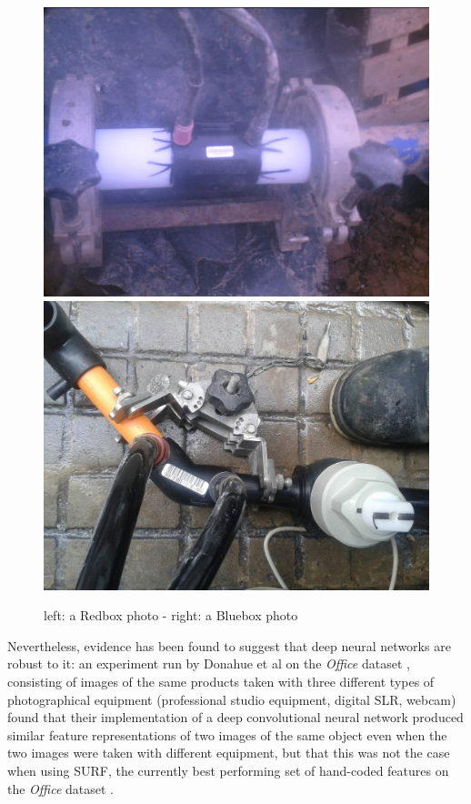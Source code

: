 \documentclass[a4paper,11pt]{article}
\begin{document}
\begin{figure}[h!]
	\centering
	\includegraphics[scale=0.34]{images/perfect3.jpg}
	\includegraphics[scale=0.17]{images/niceBluebox_100974.jpg}
	\caption{left: a Redbox photo - right: a Bluebox photo}
\end{figure}

Nevertheless, evidence has been found to suggest that deep neural networks are robust to it: an experiment run by Donahue et al on the \textit{Office} dataset \cite{office}, consisting of images of the same products taken with three different types of photographical equipment (professional studio equipment, digital SLR, webcam) found that their implementation of a deep convolutional neural network produced similar feature representations of two images of the same object even when the two images were taken with different equipment, but that this was not the case when using SURF, the currently best performing set of hand-coded features on the \textit{Office} dataset \cite{surf}. \\
\end{document}
